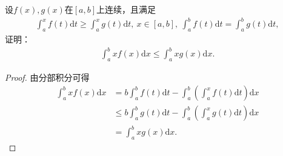 \documentclass[../../main.tex]{subfiles}%
\begin{document}
\begin{example}
设$f(x),g(x)$在$[a,b]$上连续，且满足
\begin{align*}
\int_a^x f(t)\mathrm{d}t \geqslant \int_a^x g(t)\mathrm{d}t, \ x\in[a,b], \ \int_a^b f(t)\mathrm{d}t = \int_a^b g(t)\mathrm{d}t,
\end{align*}
证明：
\begin{align*}
\int_a^b xf(x)\mathrm{d}x \leqslant \int_a^b xg(x)\mathrm{d}x.
\end{align*}
\end{example}
\begin{proof}

由分部积分可得
\begin{align*}
\int_a^b{xf\left( x \right) \mathrm{d}x}&=b\int_a^b{f\left( t \right) \mathrm{d}t}-\int_a^b{\left( \int_a^x{f\left( t \right) \mathrm{d}t} \right) \mathrm{d}x}
\\
&\leqslant b\int_a^b{g\left( t \right) \mathrm{d}t}-\int_a^b{\left( \int_a^x{g\left( t \right) \mathrm{d}t} \right) \mathrm{d}x}
\\
&=\int_a^b{xg\left( x \right) \mathrm{d}x}.
\end{align*}

\end{proof}
\end{document}
